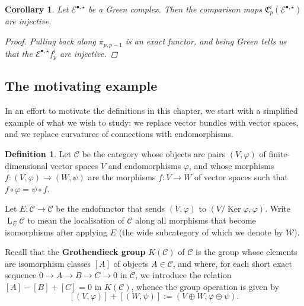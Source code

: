 \documentclass[11pt,fleqn]{article}
\theoremstyle{plain}
\newtheorem{corollary}[theorem]{Corollary}
\theoremstyle{definition}
\newtheorem{definition}[theorem]{Definition}
\theoremstyle{remark}
\numberwithin{equation}{theorem}
\newcommand{\anotherbullet}{\star}
\newcommand{\define}[1]{\textbf{#1}}
\newcommand{\comparison}[1]{\mathfrak{C}_{#1}}
\DeclareMathOperator{\Ker}{Ker}
\DeclareMathOperator{\LL}{L}
\begin{document}
        \begin{corollary}\label{corollary:Green-has-injective-comparisons}
            Let $\mathcal{E}^{\bullet,\anotherbullet}$ be a Gre{}en complex.
            Then the comparison maps $\comparison{p}^i(\mathcal{E}^{\bullet,\anotherbullet})$ are injective.

            \begin{proof}
                Pulling back along $\pi_{p,p-1}$ is an exact functor, and being Gre{}en tells us that the $\mathcal{E}^{\bullet,\anotherbullet} f_p^i$ are injective.
            \end{proof}
        \end{corollary}


    \subsection{The motivating example}\label{subsection:the-motivating-example}

        In an effort to motivate the definitions in this chapter, we start with a simplified example of what we wish to study: we replace vector bundles with vector spaces, and we replace curvatures of connections with endomorphisms.

        \begin{definition}
            Let $\mathcal{C}$ be the category whose objects are pairs $(V,\varphi)$ of finite-dimensional vector spaces $V$ and endomorphisms $\varphi$, and whose morphisms $f\colon(V,\varphi)\to(W,\psi)$ are the morphisms $f\colon V\to W$ of vector spaces such that $f\circ\varphi=\psi\circ f$.

            Let $E\colon\mathcal{C}\to\mathcal{C}$ be the endofunctor that sends $(V,\varphi)$ to $(V/\Ker\varphi,\varphi)$.
            Write $\LL_E\mathcal{C}$ to mean the localisation of $\mathcal{C}$ along all morphisms that become isomorphisms after applying $E$ (the wide subcategory of which we denote by $\mathcal{W}$).
        \end{definition}

        Recall that the \define{Grothendieck group} $K(\mathcal{C})$ of $\mathcal{C}$ is the group whose elements are isomorphism classes $[A]$ of objects $A\in\mathcal{C}$, and where, for each short exact sequence $0\to A\to B\to C\to 0$ in $\mathcal{C}$, we introduce the relation $[A]-[B]+[C]=0$ in $K(\mathcal{C})$, whence the group operation is given by
        \[
            [(V,\varphi)] + [(W,\psi)]
            :=
            (V\oplus W,\varphi\oplus\psi).
        \]
\end{document}
